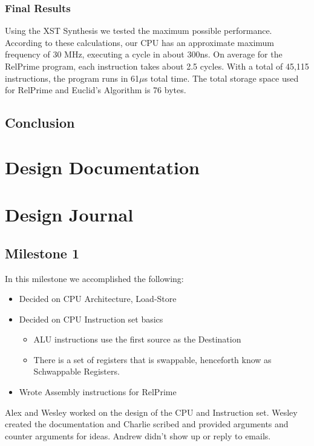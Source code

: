 \documentclass{report}
\begin{document}
		\subsection{Final Results}
			Using the XST Synthesis we tested the maximum possible performance. According to these calculations, our CPU has an approximate maximum frequency of 30 MHz, executing a cycle in about 300ns. On average for the RelPrime program, each instruction takes about 2.5 cycles. With a total of 45,115 instructions, the program runs in 61$\mu$s total time. The total storage space used for RelPrime and Euclid’s Algorithm is 76 bytes.

	\section{Conclusion}

\chapter{Design Documentation}
	

\chapter{Design Journal}
	\section{Milestone 1}
		In this milestone we accomplished the following:
		\begin{itemize}
			\item Decided on CPU Architecture, Load-Store
			\item Decided on CPU Instruction set basics
			\begin{itemize}
				\item ALU instructions use the first source as the Destination
				\item There is a set of registers that is swappable, henceforth know as Schwappable Registers.
			\end{itemize}
			\item Wrote Assembly instructions for RelPrime
		\end{itemize}
		Alex and Wesley worked on the design of the CPU and Instruction set. Wesley created the documentation and Charlie scribed and provided arguments and counter arguments for ideas.  Andrew didn't show up or reply to emails.
\end{document}
